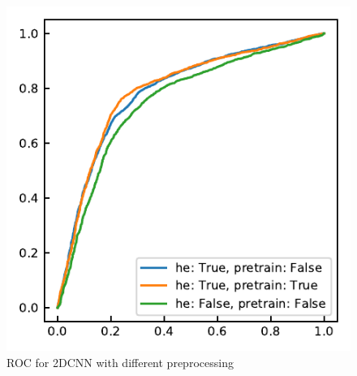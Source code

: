 \begin{figure}[H]
	\centering
	\includegraphics[width=0.5\linewidth]{fig/chapter4/2dcnn_preprocessing}
	\caption{ROC for 2DCNN with different preprocessing}
	\label{fig:2dcnnpreprocessing}
\end{figure}

